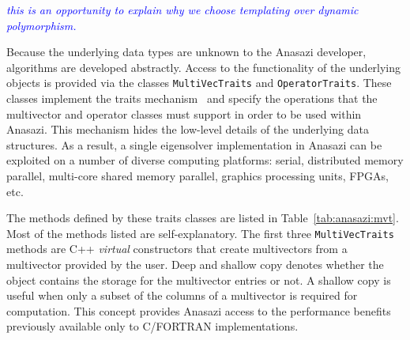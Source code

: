 \documentclass[acmtoms]{acmtrans2m}
\newcounter{algorithm}
\newcommand{\aspace}[1]{\texttt{#1}}
\newcommand{\cbcomm}[1]{\textcolor{blue}{\emph{#1}}}
\begin{document}
\cbcomm{this is an opportunity to explain why we choose templating
over dynamic polymorphism.}

Because the underlying data types are unknown to the Anasazi
developer, algorithms are developed abstractly. Access to the
functionality of the underlying objects is provided via the classes
\aspace{MultiVecTraits} and \aspace{OperatorTraits}. These classes
implement the traits mechanism~\cite{myer:95} and specify the
operations that the multivector and operator classes must support in
order to be used within Anasazi. This mechanism hides the low-level
details of the underlying data structures.  As a result, a single
eigensolver implementation in Anasazi can be exploited on a number of
diverse computing platforms: serial, distributed memory parallel,
multi-core shared memory parallel, graphics processing units, FPGAs,
etc.

The methods defined by these traits classes are listed in
Table~\ref{tab:anasazi:mvt}. Most of the methods listed are
self-explanatory. The first three \aspace{MultiVecTraits} methods are
C++ \emph{virtual} constructors \cite[pp.~123--129]{meyers:96} that
create multivectors from a multivector provided by the user. Deep and
shallow copy denotes whether the object contains the storage for the
multivector entries or not. A shallow copy is useful when only a
subset of the columns of a multivector is required for computation.
This concept provides Anasazi access to the performance benefits
previously available only to C/FORTRAN implementations.
\end{document}
